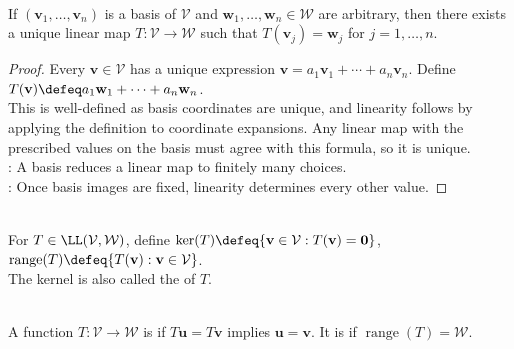 \begin{proposition} \label{prop:linear-map-determined-by-basis} \\
If $(\mathbf{v}_1, \ldots, \mathbf{v}_n)$ is a basis of $\mathcal{V}$ and $\mathbf{w}_1, \ldots, \mathbf{w}_n \in \mathcal{W}$ are arbitrary, then there exists a unique linear map $T : \mathcal{V} \to \mathcal{W}$ such that $T(\mathbf{v}_j) = \mathbf{w}_j$ for $j=1,\ldots,n$.
\begin{proof}
Every $\mathbf{v} \in \mathcal{V}$ has a unique expression $\mathbf{v} = a_1\mathbf{v}_1 + \cdots + a_n\mathbf{v}_n$. Define $T(\mathbf{v}) \defeq a_1\mathbf{w}_1 + \cdots + a_n\mathbf{w}_n$.\\
This is well-defined as basis coordinates are unique, and linearity follows by applying the definition to coordinate expansions. Any linear map with the prescribed values on the basis must agree with this formula, so it is unique.\\
: A basis reduces a linear map to finitely many choices.\\
: Once basis images are fixed, linearity determines every other value.
\end{proof}
\end{proposition}

\begin{definition} \label{def:kernel-and-range-linear-map} \\
For $T \in \LL(\mathcal{V}, \mathcal{W})$, define $\ker(T) \defeq \{ \mathbf{v} \in \mathcal{V} : T(\mathbf{v}) = \mathbf{0} \}$, $\operatorname{range}(T) \defeq \{ T(\mathbf{v}) : \mathbf{v} \in \mathcal{V} \}$.\\
The kernel is also called the  of $T$.
\end{definition}

\begin{definition} \\
A function $T:\mathcal{V}\to\mathcal{W}$ is  if $T\mathbf{u}=T\mathbf{v}$ implies $\mathbf{u}=\mathbf{v}$. It is  if $\operatorname{range}(T)=\mathcal{W}$.
\end{definition}

